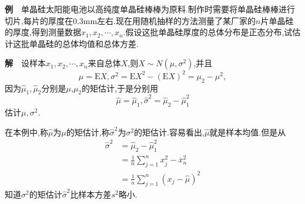 	\begin{frame}
		\textbf{例}$\quad$单晶硅太阳能电池以高纯度单晶硅棒棒为原料.制作时需要将单晶硅棒棒进行切片,每片的厚度在0.3mm左右.现在用随机抽样的方法测量了某厂家的$n$片单晶硅的厚度,得到测量数据$x_1,x_2,\cdots,x_n$.假设这批单晶硅厚度的总体分布是正态分布,试估计这批单晶硅的总体均值和总体方差.
		
		\textbf{解}$\quad$设样本$x_1,x_2,\cdots,x_n$来自总体$X$,则$X\sim N(\mu,\sigma^2)$,并且
		\begin{equation}
			\mu = \mathrm{E}X,\sigma^2 = \mathrm{E}X^2-(\mathrm{E}X)^2 = \mu_2-\mu^2,
		\end{equation}
		因为$\widehat{\mu}_1,\widehat{\mu}_2$分别是$\mu$,$\mu_2$的矩估计,于是分别用
		\begin{equation}
			\widehat{\mu} = \widehat{\mu}_1,\widehat{\sigma}^2 = \widehat{\mu}_2 - \widehat{\mu}_1^2
		\end{equation}
		估计$\mu,\sigma^2$.
		
	\end{frame}

	\begin{frame}
		在本例中,称$\widehat{\mu}$为$\mu$的矩估计,称$\widehat{\sigma}^2$为$\sigma^2$的矩估计.容易看出,$\widehat{\mu}$就是样本均值.但是从
		\begin{equation}
			\begin{split}
				\widehat{\sigma}^2 &= \widehat{\mu}_2 - \widehat{\mu}_1^2 \\
				&= \frac{1}{n}\sum_{j=1}^nx_j^2 - \overline{x}_n^2 \\
				&= \frac{1}{n}\sum_{j=1}^n(x_j - \widehat{\mu})^2
			\end{split}
		\end{equation}
		知道$\sigma^2$的矩估计$\widehat{\sigma}^2$比样本方差$s^2$略小.
	\end{frame}

